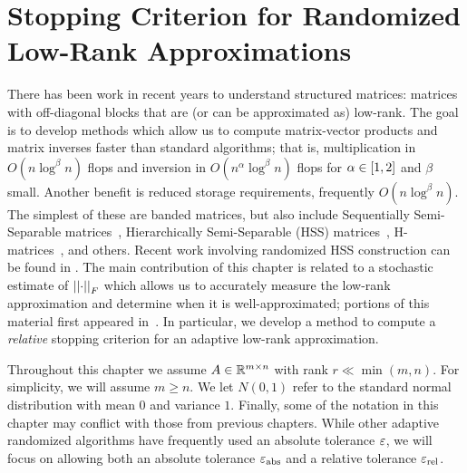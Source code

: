 \chapter{Stopping Criterion for Randomized Low-Rank Approximations}
\label{chap:random}

There has been work in recent years to understand
structured matrices: matrices with off-diagonal blocks that
are (or can be approximated as) low-rank.
The goal is to develop methods which allow us to compute
matrix-vector products and matrix inverses faster than
standard algorithms; that is, multiplication in $O(n\log^{\beta}n)$
flops and inversion in $O(n^{\alpha}\log^{\beta}n)$ flops
for $\alpha\in\left[ 1,2 \right]$ and $\beta$ small.
Another benefit is reduced storage requirements,
frequently $O(n\log^{\beta}n)$.
The simplest of these are banded matrices, but also include
Sequentially Semi-Separable matrices~\cite{chandrasekaran2005some},
Hierarchically Semi-Separable (HSS)
matrices~\cite{Chandrasekaran2005HSS,chandrasekaran2006fast},
H-matrices~\cite{hackbusch1999sparse}, and others.
Recent work involving randomized HSS construction can be found in
\cite{martinsson2011fast,rouet2016distributed,ghysels2017robust}.
The main contribution of this chapter is related to
a stochastic estimate of $\left| \left| \cdot \right| \right|_{F}$ which
allows us to accurately measure the low-rank approximation
and determine when it is well-approximated;
portions of this material first appeared in~\cite{randomHSSLBL}.
In particular, we develop a method to compute a \emph{relative}
stopping criterion for an adaptive low-rank approximation.

Throughout this chapter we assume $A\in\mathbb{R}^{m\times n}$
with rank $r\ll \min(m,n)$.
For simplicity, we will assume $m\ge n$.
We let $N(0,1)$ refer to the standard normal distribution
with mean $0$ and variance $1$.
Finally, some of the notation in this chapter may conflict with those
from previous chapters.
While other adaptive randomized algorithms have frequently used
an absolute tolerance $\varepsilon$, we will focus on allowing both
an absolute tolerance $\varepsilon_{\text{abs}}$ and a relative tolerance $\varepsilon_{\text{rel}}$.

